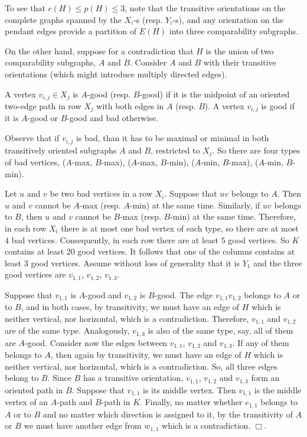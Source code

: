 \documentclass[10pt,a4paper]{article}
\def\qed{\hfill $\Box$}
\begin{document}
  To see that $c(H)\le p(H)\le 3$,
  note that the transitive orientations on the complete graphs spanned by the
  $X_i$-s (resp. $Y_i$-s), and any orientation on the pendant edges provide a partition of $E(H)$ into three comparability subgraphs.

  On the other hand, suppose for a contradiction that
  $H$  is the union of two comparability subgraphs, $A$ and $B$.
Consider $A$ and $B$
with their transitive orientations (which might introduce multiply directed edges).

A vertex $v_{i,j}\in X_j$ is  $A$-good (resp. $B$-good)
if it is
the midpoint of an oriented two-edge path in
row $X_j$ with both edges in $A$ (resp. $B$).
A vertex $v_{i,j}$ is good if it is $A$-good or $B$-good and bad otherwise.

Observe that if $v_{i,j}$ is bad, than it has to be maximal or minimal in both
transitively oriented subgraphs $A$ and $B$, restricted to $X_j$.
So there are four types of bad vertices, ($A$-max, $B$-max),
($A$-max, $B$-min),  ($A$-min, $B$-max),  ($A$-min, $B$-min).

Let $u$ and $v$ be two bad vertices
in a row $X_i$. Suppose that $uv$ belongs to $A$.
Then $u$ and $v$ cannot be $A$-max (resp. $A$-min) at the same time.
Similarly, if $uv$ belongs to $B$,
then $u$ and $v$ cannot be $B$-max (resp. $B$-min) at the same time.
Therefore, in each row $X_i$ there is at most one bad vertex of each type, so there are at most $4$ bad vertices.
Consequently, in each row there are at least $5$ good vertices.
So $K$ contains at least $20$ good vertices. It follows that one of the columns contains at least $3$ good vertices.
Assume without loss of generality that it is $Y_1$ and the three good vertices are $v_{1,1}$, $v_{1,2}$, $v_{1,3}$.

Suppose that $v_{1,1}$ is $A$-good and $v_{1,2}$ is $B$-good.
The edge $v_{1,1}v_{1,2}$ belongs to $A$ or to $B$, and in both cases, by transitivity,
we must have an edge of $H$ which is neither vertical, nor horizontal, which is a contradiction.
Therefore,  $v_{1,1}$ and $v_{1,2}$ are of the same type. Analogously, $v_{1,3}$ is also of the same type, say, all of them are $A$-good.
Consider now the edges between  $v_{1,1}$, $v_{1,2}$ and  $v_{1,3}$. If any of them belongs to $A$, then again  by transitivity,
we must have an edge of $H$ which is neither vertical, nor horizontal, which is a contradiction.
So, all three edges belong to $B$. Since $B$ has a transitive orientation,
$v_{1,1}$, $v_{1,2}$ and  $v_{1,3}$ form an oriented path in $B$. Suppose that $v_{1,1}$ is its middle vertex.
Then $v_{1,1}$ is the middle vertex of an $A$-path and $B$-path in $K$.
Finally, no matter whether $e_{1,1}$ belongs to $A$ or to $B$ and no matter which direction is assigned to it,
by the transitivity of $A$ or $B$ we must have another edge from $w_{1,1}$ which is a contradiction.
\qed.
\end{document}
